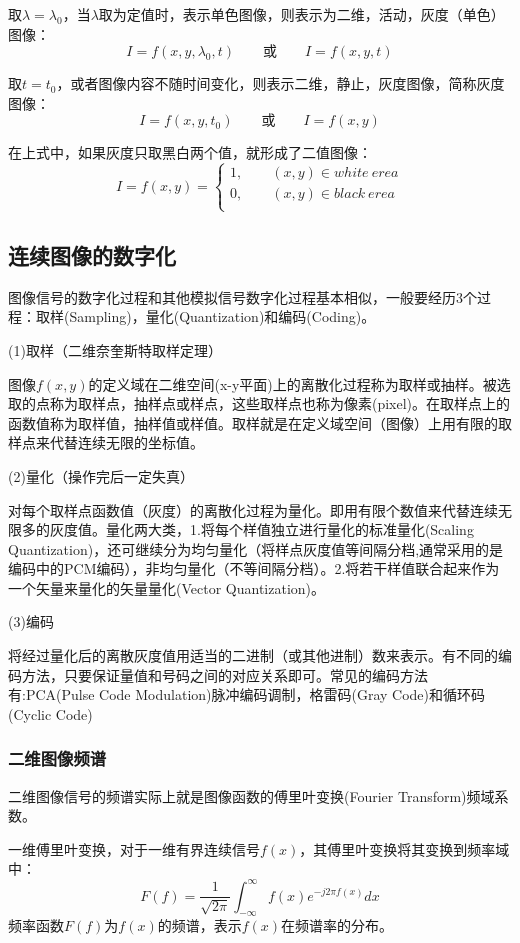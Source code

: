 \documentclass[11pt]{article}
\begin{document}
取$\lambda = \lambda_0$，当$\lambda$取为定值时，表示单色图像，则表示为二维，活动，灰度（单色）图像：
$$I = f(x,y,\lambda_0,t)\qquad \text{或} \qquad I = f(x,y,t)$$

取$t=t_0$，或者图像内容不随时间变化，则表示二维，静止，灰度图像，简称灰度图像：
$$I = f(x,y,t_0)\qquad \text{或} \qquad I = f(x,y)$$

在上式中，如果灰度只取黑白两个值，就形成了二值图像：
$$I = f(x,y) = \left\{\begin{matrix}
	1, \qquad (x,y)\in white\ erea \\ 
	0, \qquad (x,y)\in black\ erea \\
\end{matrix}\right.$$
\subsection{连续图像的数字化}
图像信号的数字化过程和其他模拟信号数字化过程基本相似，一般要经历3个过程：取样(Sampling)，量化(Quantization)和编码(Coding)。

(1)取样（二维奈奎斯特取样定理）

图像$f(x,y)$的定义域在二维空间(x-y平面)上的离散化过程称为取样或抽样。被选取的点称为取样点，抽样点或样点，这些取样点也称为像素(pixel)。在取样点上的函数值称为取样值，抽样值或样值。取样就是在定义域空间（图像）上用有限的取样点来代替连续无限的坐标值。

(2)量化（操作完后一定失真）

对每个取样点函数值（灰度）的离散化过程为量化。即用有限个数值来代替连续无限多的灰度值。量化两大类，1.将每个样值独立进行量化的标准量化(Scaling Quantization)，还可继续分为均匀量化（将样点灰度值等间隔分档,通常采用的是编码中的PCM编码），非均匀量化（不等间隔分档）。2.将若干样值联合起来作为一个矢量来量化的矢量量化(Vector Quantization)。

(3)编码

将经过量化后的离散灰度值用适当的二进制（或其他进制）数来表示。有不同的编码方法，只要保证量值和号码之间的对应关系即可。常见的编码方法有:PCA(Pulse Code Modulation)脉冲编码调制，格雷码(Gray Code)和循环码(Cyclic Code)

\subsubsection{二维图像频谱}

二维图像信号的频谱实际上就是图像函数的傅里叶变换(Fourier Transform)频域系数。

一维傅里叶变换，对于一维有界连续信号$f(x)$，其傅里叶变换将其变换到频率域中：
$$F(f) = \frac{1}{\sqrt{2\pi}}\int_{-\infty}^{\infty}f(x)e^{-j2\pi f(x)}dx$$
频率函数$F(f)$为$f(x)$的频谱，表示$f(x)$在频谱率的分布。
\end{document}
